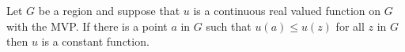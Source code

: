 Let $G$ be a region and suppose that $u$ is a continuous real valued function on $G$ with the MVP. If there is a point $a$ in $G$ such that $u(a) \leq u(z)$ for all $z$ in $G$ then $u$ is a constant function.

